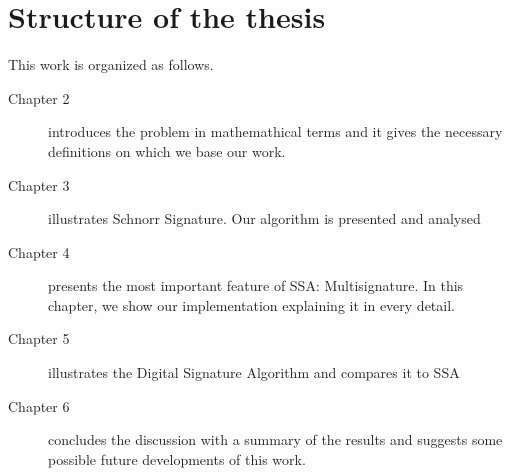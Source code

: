 \section{Structure of the thesis} 
This work is organized as follows.
\begin{description}
	\item[Chapter 2] introduces the problem in mathemathical terms and it gives the necessary definitions on which we base our work.
	\item[Chapter 3] illustrates Schnorr Signature. Our algorithm is presented and analysed
	\item[Chapter 4] presents the most important feature of SSA: Multisignature. In this chapter, we show our implementation explaining it in every detail.
	\item[Chapter 5] illustrates the Digital Signature Algorithm and compares it to SSA 
	\item[Chapter 6] concludes the discussion with a summary of the results and suggests some possible future developments of this work.
\end{description}